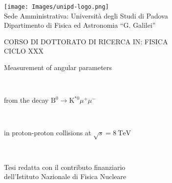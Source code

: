 \begin{titlepage}
  {\center\texttt{[image: Images/unipd-logo.png]}\\[1cm]}
  {\large Sede Amministrativa: Universit\`{a} degli Studi di Padova}\\

  \vspace{-0.3 cm}
  {\large Dipartimento di Fisica ed Astronomia ``G. Galilei''}\\

  \vspace{1 cm}
  
  {\large CORSO DI DOTTORATO DI RICERCA IN: FISICA}\\

  {\large CICLO XXX}\\

  \vspace{1 cm}
  
  {\Large \bfseries
    \centerline{Measurement of angular parameters}\\


    \centerline{from the decay $\mathrm{B}^0 \to \mathrm{K}^{*0} \mu^+ \mu^-$}\\


    \centerline{in proton-proton collisions at $\sqrt{s}=8~\mathrm{TeV}$}}\\%

  \vspace{2.5cm}

  {\small
    Tesi redatta con il contributo finanziario \\

    \vspace{-0.3cm}
    dell'Istituto Nazionale di Fisica Nucleare}\\


\end{titlepage}
